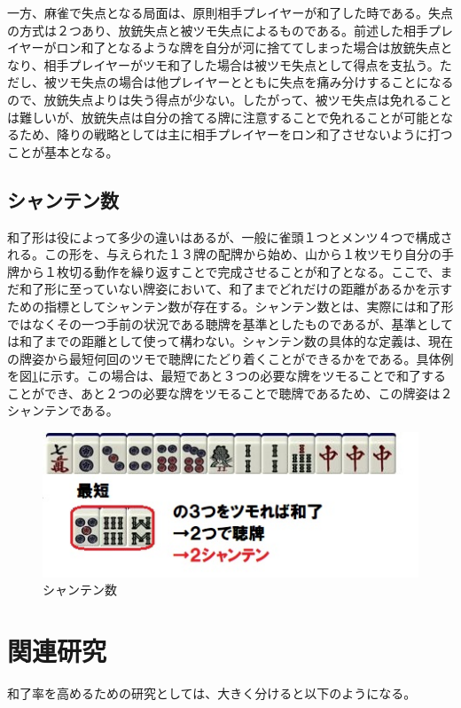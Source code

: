 一方、麻雀で失点となる局面は、原則相手プレイヤーが和了した時である。失点の方式は２つあり、放銃失点と被ツモ失点によるものである。前述した相手プレイヤーがロン和了となるような牌を自分が河に捨ててしまった場合は放銃失点となり、相手プレイヤーがツモ和了した場合は被ツモ失点として得点を支払う。ただし、被ツモ失点の場合は他プレイヤーとともに失点を痛み分けすることになるので、放銃失点よりは失う得点が少ない。したがって、被ツモ失点は免れることは難しいが、放銃失点は自分の捨てる牌に注意することで免れることが可能となるため、降りの戦略としては主に相手プレイヤーをロン和了させないように打つことが基本となる。

\subsection{シャンテン数}
和了形は役によって多少の違いはあるが、一般に雀頭１つとメンツ４つで構成される。この形を、与えられた１３牌の配牌から始め、山から１枚ツモり自分の手牌から１枚切る動作を繰り返すことで完成させることが和了となる。ここで、まだ和了形に至っていない牌姿において、和了までどれだけの距離があるかを示すための指標としてシャンテン数が存在する。シャンテン数とは、実際には和了形ではなくその一つ手前の状況である聴牌を基準としたものであるが、基準としては和了までの距離として使って構わない。シャンテン数の具体的な定義は、現在の牌姿から最短何回のツモで聴牌にたどり着くことができるかをである。具体例を図\ref{2syanten}に示す。この場合は、最短であと３つの必要な牌をツモることで和了することができ、あと２つの必要な牌をツモることで聴牌であるため、この牌姿は２シャンテンである。

\begin{figure}[H]
 \centering
 \includegraphics[keepaspectratio, scale=1,bb=0 0 320 200]
      {img/2syanten.jpg}
 \caption{シャンテン数}
 \label{2syanten}
\end{figure}

\section{関連研究}
和了率を高めるための研究としては、大きく分けると以下のようになる。


